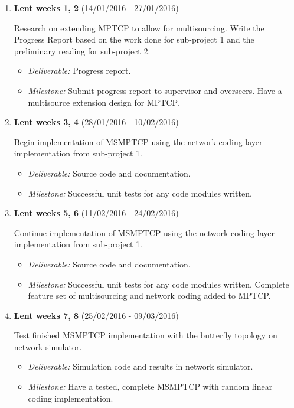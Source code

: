 \documentclass[12pt,a4paper,twoside]{article}
\begin{document}
\begin{enumerate}
\item {\bf Lent weeks 1, 2} (14/01/2016 - 27/01/2016)

Research on extending MPTCP to allow for multisourcing.
Write the Progress Report based on the work done for sub-project 1 and the preliminary reading for sub-project 2.
\begin{itemize}
  \item {\em Deliverable:} Progress report.
  \item {\em Milestone:} Submit progress report to supervisor and overseers. Have a multisource extension design for MPTCP.
\end{itemize}

\item {\bf Lent weeks 3, 4} (28/01/2016 - 10/02/2016)

Begin implementation of MSMPTCP using the network coding layer implementation from sub-project 1.
\begin{itemize}
  \item {\em Deliverable:} Source code and documentation.
  \item {\em Milestone:} Successful unit tests for any code modules written.
\end{itemize}

\item {\bf Lent weeks 5, 6} (11/02/2016 - 24/02/2016)

Continue implementation of MSMPTCP using the network coding layer implementation from sub-project 1.
\begin{itemize}
  \item {\em Deliverable:} Source code and documentation.
  \item {\em Milestone:} Successful unit tests for any code modules written. Complete feature set of multisourcing and network coding added to MPTCP.
\end{itemize}

\item {\bf Lent weeks 7, 8} (25/02/2016 - 09/03/2016)

Test finished MSMPTCP implementation with the butterfly topology on network simulator.
\begin{itemize}
  \item {\em Deliverable:} Simulation code and results in network simulator.
  \item {\em Milestone:} Have a tested, complete MSMPTCP with random linear coding implementation.
\end{itemize}


\end{enumerate}
\end{document}
